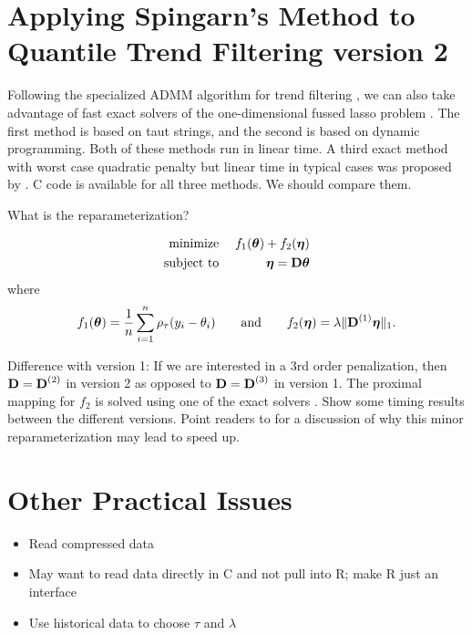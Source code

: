 \documentclass[12pt]{article}
\numberwithin{equation}{section}
\theoremstyle{plain}
\newcommand{\V}[1]{{\bm{\mathbf{\MakeLowercase{#1}}}}} %
\newcommand{\VE}[2]{\MakeLowercase{#1}_{#2}} %
\newcommand{\M}[1]{{\bm{\mathbf{\MakeUppercase{#1}}}}} %
\newcommand{\Mn}[2]{\M{#1}^{(#2)}} %
\begin{document}
\section{Applying Spingarn's Method to Quantile Trend Filtering version 2}

Following the specialized ADMM algorithm for trend filtering \citep{Ramdas2016}, we can also take advantage of fast exact solvers of the one-dimensional fussed lasso problem \citep{davies2001, Johnson2013}. The first method is based on taut strings, and the second is based on dynamic programming. Both of these methods run in linear time. A third exact method with worst case quadratic penalty but linear time in typical cases was proposed by \cite{Condat2013}. C code is available for all three methods. We should compare them.

What is the reparameterization?

\begin{eqnarray*}
	\text{minimize}\; && f_1(\V{\theta}) + f_2(\V{\eta}) \\
	\text{subject to}\; && \V{\eta} = \M{D}\V{\theta}
\end{eqnarray*}
where
\begin{eqnarray*}
	f_1(\V{\theta}) = \frac{1}{n}\sum_{i=1}^n \rho_\tau(\VE{y}{i} - \VE{\theta}{i}) \quad\quad \text{and} \quad\quad
	f_2(\V{\eta}) = \lambda\lVert \Mn{D}{1}\V{\eta} \rVert_1.
\end{eqnarray*}

Difference with version 1: If we are interested in a 3rd order penalization, then $\M{D} = \Mn{D}{2}$ in version 2 as opposed to $\M{D} = \Mn{D}{3}$ in version 1. The proximal mapping for $f_2$ is solved using one of the exact solvers \citep{davies2001, Johnson2013, Condat2013}. Show some timing results between the different versions. Point readers to \cite{Ramdas2016} for a discussion of why this minor reparameterization may lead to speed up.

\section{Other Practical Issues}

\begin{itemize}
	\item Read compressed data
	\item May want to read data directly in C and not pull into R; make R just an interface
	\item Use historical data to choose $\tau$ and $\lambda$
\end{itemize}
\end{document}
